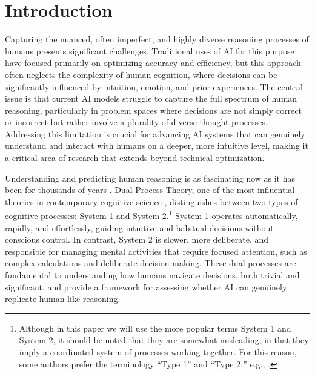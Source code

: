 \section{Introduction}\label{sec:introduction}

    Capturing the nuanced, often imperfect, and highly diverse reasoning processes of humans presents significant challenges. Traditional uses of AI for this purpose have focused primarily on optimizing accuracy and efficiency, but this approach often neglects the complexity of human cognition, where decisions can be significantly influenced by intuition, emotion, and prior experiences. The central issue is that current AI models struggle to capture the full spectrum of human reasoning, particularly in problem spaces where decisions are not simply correct or incorrect but rather involve a plurality of diverse thought processes. Addressing this limitation is crucial for advancing AI systems that can genuinely understand and interact with humans on a deeper, more intuitive level, making it a critical area of research that extends beyond technical optimization.

    Understanding and predicting human reasoning is as fascinating now as it has been for thousands of years \citep{Wason1966-WASR, aristotle_organon_2013}. Dual Process Theory, one of the most influential theories in contemporary cognitive science \citep{stanovich_individual_2000, Kahneman2011}, distinguishes between two types of cognitive processes: System 1 and System 2.\footnote{Although in this paper we will use the more popular terms System 1 and System 2, it should be noted that they are somewhat misleading, in that they imply a coordinated system of processes working together. For this reason, some authors prefer the terminology ``Type 1'' and ``Type 2,'' e.g., \cite{Evans2018}.} System 1 operates automatically, rapidly, and effortlessly, guiding intuitive and habitual decisions without conscious control. In contrast, System 2 is slower, more deliberate, and responsible for managing mental activities that require focused attention, such as complex calculations and deliberate decision-making. These dual processes are fundamental to understanding how humans navigate decisions, both trivial and significant, and provide a framework for assessing whether AI can genuinely replicate human-like reasoning.

